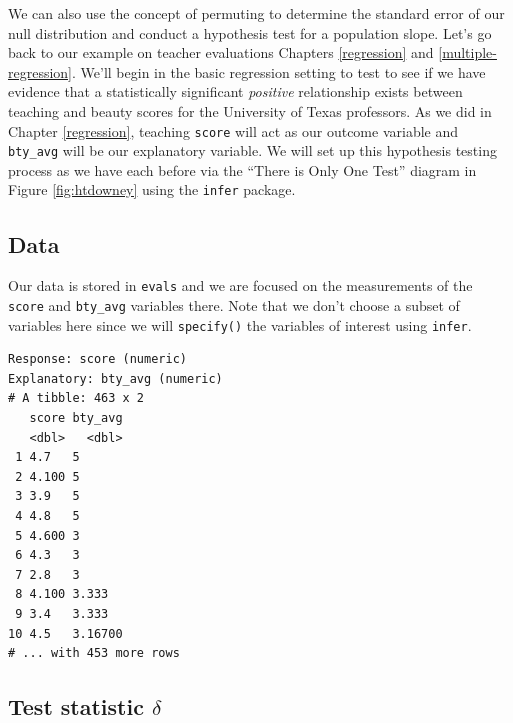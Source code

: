 \documentclass[12pt, krantz2,]{krantz}
\makeatletter
\newenvironment{Shaded}{\begin{snugshade}}{\end{snugshade}}
\newcommand{\KeywordTok}[1]{\textcolor[rgb]{0.27,0.27,0.27}{\textbf{#1}}}
\newcommand{\NormalTok}[1]{#1}
\newcommand{\OperatorTok}[1]{\textcolor[rgb]{0.43,0.43,0.43}{\textbf{#1}}}
\newcommand{\StringTok}[1]{\textcolor[rgb]{0.5,0.5,0.5}{#1}}
\newenvironment{kframe}{%
\medskip{}
\setlength{\fboxsep}{.8em}
 \def\at@end@of@kframe{}%
 \ifinner\ifhmode%
  \def\at@end@of@kframe{\end{minipage}}%
  \begin{minipage}{\columnwidth}%
 \fi\fi%
 \def\FrameCommand##1{\hskip\@totalleftmargin \hskip-\fboxsep
 \colorbox{shadecolor}{##1}\hskip-\fboxsep
     \hskip-\linewidth \hskip-\@totalleftmargin \hskip\columnwidth}%
 \MakeFramed {\advance\hsize-\width
   \@totalleftmargin\z@ \linewidth\hsize
   \@setminipage}}%
 {\par\unskip\endMakeFramed%
 \at@end@of@kframe}
\renewenvironment{Shaded}{\begin{kframe}}{\end{kframe}}
\makeatother
\begin{document}
We can also use the concept of permuting to determine the standard error of our null distribution and conduct a hypothesis test for a population slope. Let's go back to our example on teacher evaluations Chapters \ref{regression} and \ref{multiple-regression}. We'll begin in the basic regression setting to test to see if we have evidence that a statistically significant \emph{positive} relationship exists between teaching and beauty scores for the University of Texas professors. As we did in Chapter \ref{regression}, teaching \texttt{score} will act as our outcome variable and \texttt{bty\_avg} will be our explanatory variable. We will set up this hypothesis testing process as we have each before via the ``There is Only One Test'' diagram in Figure \ref{fig:htdowney} using the \texttt{infer} package.

\hypertarget{data-1}{%
\subsection{Data}\label{data-1}}

Our data is stored in \texttt{evals} and we are focused on the measurements of the \texttt{score} and \texttt{bty\_avg} variables there. Note that we don't choose a subset of variables here since we will \texttt{specify()} the variables of interest using \texttt{infer}.

\begin{Shaded}
\end{Shaded}

\begin{verbatim}
Response: score (numeric)
Explanatory: bty_avg (numeric)
# A tibble: 463 x 2
   score bty_avg
   <dbl>   <dbl>
 1 4.7   5      
 2 4.100 5      
 3 3.9   5      
 4 4.8   5      
 5 4.600 3      
 6 4.3   3      
 7 2.8   3      
 8 4.100 3.333  
 9 3.4   3.333  
10 4.5   3.16700
# ... with 453 more rows
\end{verbatim}

\hypertarget{test-statistic-delta-1}{%
\subsection{\texorpdfstring{Test statistic \(\delta\)}{Test statistic \textbackslash{}delta}}\label{test-statistic-delta-1}}
\end{document}
